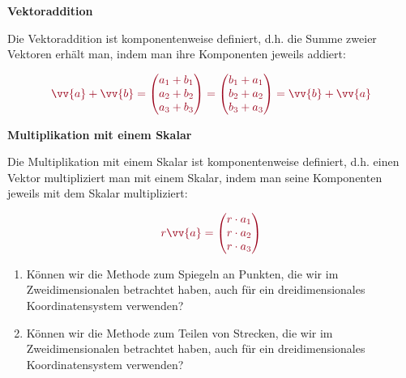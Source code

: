 \begin{tcolorbox}
	\textbf{Vektoraddition}
	
	\textcolor{loestc}{Die Vektoraddition ist komponentenweise definiert, d.h. die Summe zweier Vektoren erhält man, indem man ihre Komponenten jeweils addiert:}
	
	\[\textcolor{loestc}{\vv{a}+\vv{b}=\spvvv{a_1+b_1}{a_2+b_2}{a_3+b_3}=\spvvv{b_1+a_1}{b_2+a_2}{b_3+a_3}=\vv{b}+\vv{a}}\]
\end{tcolorbox}

\begin{tcolorbox}
	\textbf{Multiplikation mit einem Skalar}
	
	\textcolor{loestc}{Die Multiplikation mit einem Skalar ist komponentenweise definiert, d.h. einen Vektor multipliziert man mit einem Skalar, indem man seine Komponenten jeweils mit dem Skalar multipliziert:}
	
	\[\textcolor{loestc}{r\vv{a}=\spvvv{r\cdot a_1}{r\cdot a_2}{r\cdot a_3}}\]
\end{tcolorbox}

\begin{Exercise}[title={}, label=R3A2]
	\begin{enumerate}[label=\alph*)]
		\item Können wir die Methode zum Spiegeln an Punkten, die wir im Zweidimensionalen betrachtet haben, auch für ein dreidimensionales Koordinatensystem verwenden?
		\item Können wir die Methode zum Teilen von Strecken, die wir im Zweidimensionalen betrachtet haben, auch für ein dreidimensionales Koordinatensystem verwenden?
	\end{enumerate}
\end{Exercise}
